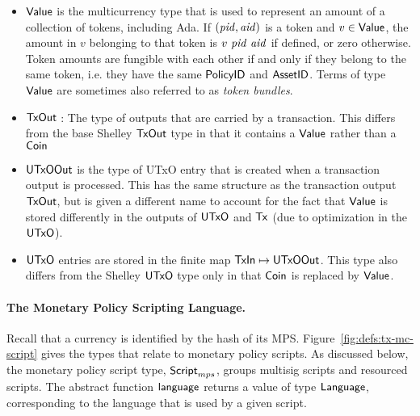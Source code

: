 \begin{itemize}
  \item $\mathsf{Value}$ is the multicurrency type that is used to represent
    an amount of a collection of tokens, including Ada. If $(\mathit{pid}, \mathit{aid})$ is a token and $v \in \mathsf{Value}$,
    the amount in $v$ belonging to that token is $v~\mathit{pid}~\mathit{aid}$ if defined, or zero otherwise.
    Token amounts are fungible with each other if and only if they belong to the same token,
    i.e. they have the same $\mathsf{PolicyID}$ and $\mathsf{AssetID}$. Terms of type $\mathsf{Value}$ are sometimes also referred to as
    \emph{token bundles}.



\item $\mathsf{TxOut}$ : The type of outputs that are carried by a transaction. This differs from the base Shelley
  $\mathsf{TxOut}$ type in that it contains a $\mathsf{Value}$ rather than a $\mathsf{Coin}$

  \item $\mathsf{UTxOOut}$ is the type of UTxO entry that is created when a transaction
  output is processed. This has the same structure as
  the transaction output $\mathsf{TxOut}$, but is given a different name to
  account for the fact that $\mathsf{Value}$ is stored differently in the outputs of $\mathsf{UTxO}$ and $\mathsf{Tx}$
  (due to optimization in the $\mathsf{UTxO}$).

  \item $\mathsf{UTxO}$ entries are stored in the finite map $\mathsf{TxIn}\mapsto \mathsf{UTxOOut}$.
  This type also differs from the Shelley $\mathsf{UTxO}$ type only in that $\mathsf{Coin}$ is replaced by $\mathsf{Value}$.

\end{itemize}

\paragraph*{The Monetary Policy Scripting Language.}
Recall that a currency is identified by the hash of its MPS.
Figure~\ref{fig:defs:tx-mc-script} gives the types that relate to monetary
policy scripts. %
As discussed below, the monetary policy script type, $\mathsf{Script}_{mps}$, groups multisig scripts
and resourced scripts.
The abstract
function $\mathsf{language}$ returns a value of type $\mathsf{Language}$,
corresponding to the language that is used by a given script.


